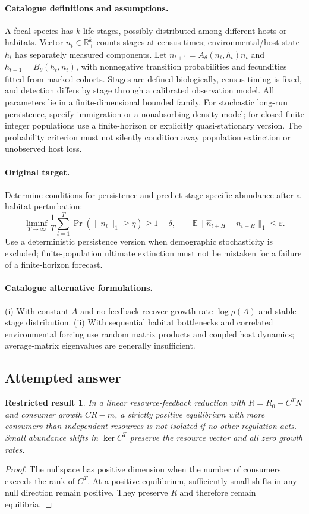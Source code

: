 \documentclass[11pt]{article}
\newcommand{\R}{\mathbb R}
\newcommand{\E}{\mathbb E}
\providecommand{\R}{\mathbb R}
\providecommand{\E}{\mathbb E}
\newtheorem{attemptresult}{Restricted result}[section]
\begin{document}
\paragraph{Catalogue definitions and assumptions.}
A focal species has $k$ life stages, possibly distributed among different hosts or habitats. Vector $n_t\in\R_+^k$ counts stages at census times; environmental/host state $h_t$ has separately measured components. Let $n_{t+1}=A_\theta(n_t,h_t)n_t$ and $h_{t+1}=B_\theta(h_t,n_t)$, with nonnegative transition probabilities and fecundities fitted from marked cohorts. Stages are defined biologically, census timing is fixed, and detection differs by stage through a calibrated observation model. All parameters lie in a finite-dimensional bounded family. For stochastic long-run persistence, specify immigration or a nonabsorbing density model; for closed finite integer populations use a finite-horizon or explicitly quasi-stationary version. The probability criterion must not silently condition away population extinction or unobserved host loss.
\paragraph{Original target.}
Determine conditions for persistence and predict stage-specific abundance after a habitat perturbation:
\[
 \liminf_{T\to\infty}\frac1T\sum_{t=1}^T
 \Pr(\|n_t\|_1\ge\eta)\ge1-\delta,
 \qquad
 \E\|\widehat n_{t+H}-n_{t+H}\|_1\le\varepsilon.
\]
Use a deterministic persistence version when demographic stochasticity is excluded; finite-population ultimate extinction must not be mistaken for a failure of a finite-horizon forecast.
\paragraph{Catalogue alternative formulations.}
(i) With constant $A$ and no feedback recover growth rate $\log\rho(A)$ and stable stage distribution. (ii) With sequential habitat bottlenecks and correlated environmental forcing use random matrix products and coupled host dynamics; average-matrix eigenvalues are generally insufficient.
\subsection{Attempted answer}
\begin{attemptresult}
In a linear resource-feedback reduction with $R=R_0-C^TN$ and consumer growth $CR-m$, a strictly positive equilibrium with more consumers than independent resources is not isolated if no other regulation acts. Small abundance shifts in $\ker C^T$ preserve the resource vector and all zero growth rates.
\end{attemptresult}
\begin{proof}
The nullspace has positive dimension when the number of consumers exceeds the rank of $C^T$. At a positive equilibrium, sufficiently small shifts in any null direction remain positive. They preserve $R$ and therefore remain equilibria.
\end{proof}
\end{document}
